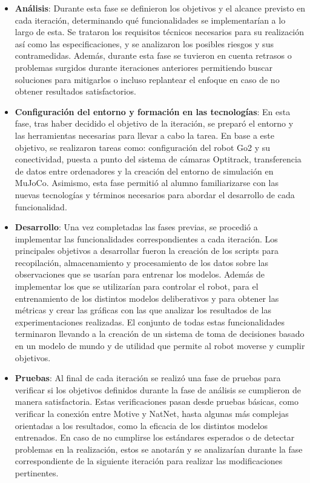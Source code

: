 \begin{itemize}
    \item \textbf{Análisis}:
    Durante esta fase se definieron los objetivos y el alcance previsto en cada iteración, determinando qué funcionalidades 
    se implementarían a lo largo de esta. Se trataron los requisitos técnicos necesarios para su realización así como 
    las especificaciones, y se analizaron los posibles riesgos y sus contramedidas. Además, durante esta fase se tuvieron 
    en cuenta retrasos o problemas surgidos durante iteraciones anteriores permitiendo buscar soluciones para mitigarlos o 
    incluso replantear el enfoque en caso de no obtener resultados satisfactorios.

    \item \textbf{Configuración del entorno y formación en las tecnologías}:
    En esta fase, tras haber decidido el objetivo de la iteración, se preparó el entorno y las herramientas necesarias para 
    llevar a cabo la tarea. En base a este objetivo, se realizaron tareas como: configuración del robot Go2 y su conectividad, 
    puesta a punto del sistema de cámaras Optitrack, transferencia de datos entre ordenadores y la creación del entorno de simulación 
    en MuJoCo.
    Asimismo, esta fase permitió al alumno familiarizarse con las nuevas tecnologías y términos necesarios para abordar el desarrollo 
    de cada funcionalidad.

    \item \textbf{Desarrollo}:
    Una vez completadas las fases previas, se procedió a implementar las funcionalidades correspondientes a cada iteración. Los principales objetivos a 
    desarrollar fueron la creación de los scripts para recopilación, almacenamiento y procesamiento de los datos sobre las observaciones que se usarían 
    para entrenar los modelos. Además de implementar los que se utilizarían para controlar el robot, para el entrenamiento de los distintos modelos 
    deliberativos y para obtener las métricas y crear las gráficas con las que analizar los resultados de las experimentaciones realizadas. El conjunto de 
    todas estas funcionalidades terminaron llevando a la creación de un sistema de toma de decisiones basado en un modelo de mundo y de utilidad que 
    permite al robot moverse y cumplir objetivos.

    \item \textbf{Pruebas}:
    Al final de cada iteración se realizó una fase de pruebas para verificar si los objetivos definidos durante la fase de análisis se 
    cumplieron de manera satisfactoria. Estas verificaciones pasan desde pruebas básicas, como verificar la conexión entre Motive y 
    NatNet, hasta algunas más complejas orientadas a los resultados, como la eficacia de los distintos modelos entrenados. En caso de no 
    cumplirse los estándares esperados o de detectar problemas en la realización, estos se anotarán y se analizarían durante la fase 
    correspondiente de la siguiente iteración para realizar las modificaciones pertinentes.

\end{itemize}

